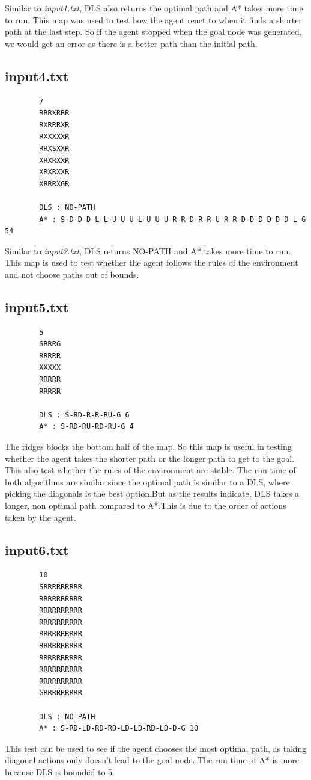 \documentclass{article}
\begin{document}
		Similar to \emph{input1.txt}, DLS also returns the optimal path and A* takes more time to run. This map was used to test how the agent react to when it finds a shorter path at the last step. So if the agent stopped when the goal node was generated, we would get an error as there is a better path than the initial path.\newline
		
	\subsection{input4.txt}	
		\begin{lstlisting}
		7
		RRRXRRR
		RXRRRXR
		RXXXXXR
		RRXSXXR
		XRXRXXR
		XRXRXXR
		XRRRXGR
		
		DLS : NO-PATH
		A* : S-D-D-D-L-L-U-U-U-L-U-U-U-R-R-D-R-R-U-R-R-D-D-D-D-D-D-L-G 54
		\end{lstlisting}
	Similar to \emph{input2.txt}, DLS returns NO-PATH and A* takes more time to run. This map is used to test whether the agent follows the rules of the environment and not choose paths out of bounds. \newline

	\newpage
	\subsection{input5.txt}	
		\begin{lstlisting}
		5
		SRRRG
		RRRRR
		XXXXX
		RRRRR
		RRRRR
		
		DLS : S-RD-R-R-RU-G 6
		A* : S-RD-RU-RD-RU-G 4
		\end{lstlisting}
		The ridges blocks the bottom half of the map. So this map is useful in testing whether the agent takes the shorter path or the longer path to get to the goal. This also test whether the rules of the environment are stable. The run time of both algorithms are similar since the optimal path is similar to a DLS, where picking the diagonals is the best option.But as the results indicate, DLS takes a longer, non optimal path compared to A*.This is due to the order of actions taken by the agent. \newline
	
	\subsection{input6.txt}	
		\begin{lstlisting}
		10
		SRRRRRRRRR
		RRRRRRRRRR
		RRRRRRRRRR
		RRRRRRRRRR
		RRRRRRRRRR
		RRRRRRRRRR
		RRRRRRRRRR
		RRRRRRRRRR
		RRRRRRRRRR
		GRRRRRRRRR
		
		DLS : NO-PATH
		A* : S-RD-LD-RD-RD-LD-LD-RD-LD-D-G 10
		\end{lstlisting}
		This test can be used to see if the agent chooses the most optimal path, as taking diagonal actions only doesn't lead to the goal node. The run time of A* is more because DLS is bounded to 5.  \newline
	
\end{document}
